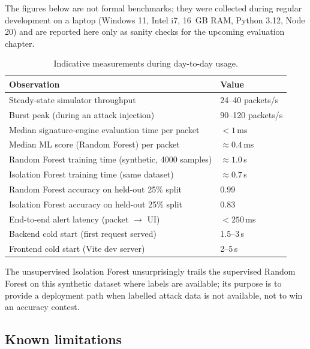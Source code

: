 The figures below are not formal benchmarks; they were collected
during regular development on a laptop (Windows 11, Intel i7,
16~GB RAM, Python 3.12, Node 20) and are reported here only as
sanity checks for the upcoming evaluation chapter.

\begin{table}[h]
\centering
\small
\begin{tabularx}{\textwidth}{l X}
\toprule
\textbf{Observation} & \textbf{Value} \\
\midrule
Steady-state simulator throughput & 24--40 packets/s \\
Burst peak (during an attack injection) & 90--120 packets/s \\
Median signature-engine evaluation time per packet & $< 1$\,ms \\
Median ML score (Random Forest) per packet & $\approx 0.4$\,ms \\
Random Forest training time (synthetic, 4000 samples) & $\approx 1.0$\,s \\
Isolation Forest training time (same dataset) & $\approx 0.7$\,s \\
Random Forest accuracy on held-out 25\% split & 0.99 \\
Isolation Forest accuracy on held-out 25\% split & 0.83 \\
End-to-end alert latency (packet $\rightarrow$ UI) & $< 250$\,ms \\
Backend cold start (first request served) & 1.5--3\,s \\
Frontend cold start (Vite dev server) & 2--5\,s \\
\bottomrule
\end{tabularx}
\caption{Indicative measurements during day-to-day usage.}
\end{table}

The unsupervised Isolation Forest unsurprisingly trails the supervised
Random Forest on this synthetic dataset where labels are available; its
purpose is to provide a deployment path when labelled attack data is
not available, not to win an accuracy contest.

\subsection{Known limitations}

